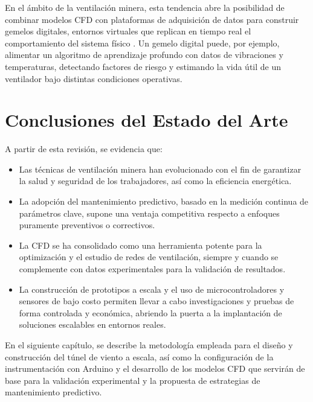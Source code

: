 En el ámbito de la ventilación minera, esta tendencia abre la posibilidad de combinar modelos CFD con plataformas de adquisición de datos para construir gemelos digitales, entornos virtuales que replican en tiempo real el comportamiento del sistema físico \cite{Fuller2020}. Un gemelo digital puede, por ejemplo, alimentar un algoritmo de aprendizaje profundo con datos de vibraciones y temperaturas, detectando factores de riesgo y estimando la vida útil de un ventilador bajo distintas condiciones operativas.

\section{Conclusiones del Estado del Arte}
A partir de esta revisión, se evidencia que:
\begin{itemize}
    \item Las técnicas de ventilación minera han evolucionado con el fin de garantizar la salud y seguridad de los trabajadores, así como la eficiencia energética.
    \item La adopción del mantenimiento predictivo, basado en la medición continua de parámetros clave, supone una ventaja competitiva respecto a enfoques puramente preventivos o correctivos.
    \item La CFD se ha consolidado como una herramienta potente para la optimización y el estudio de redes de ventilación, siempre y cuando se complemente con datos experimentales para la validación de resultados.
    \item La construcción de prototipos a escala y el uso de microcontroladores y sensores de bajo costo permiten llevar a cabo investigaciones y pruebas de forma controlada y económica, abriendo la puerta a la implantación de soluciones escalables en entornos reales.
\end{itemize}

En el siguiente capítulo, se describe la metodología empleada para el diseño y construcción del túnel de viento a escala, así como la configuración de la instrumentación con Arduino y el desarrollo de los modelos CFD que servirán de base para la validación experimental y la propuesta de estrategias de mantenimiento predictivo.